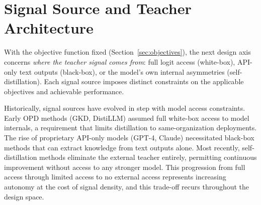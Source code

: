 \documentclass{article} %
\begin{document}
\section{Signal Source and Teacher Architecture}
\label{sec:signal}

With the objective function fixed (Section~\ref{sec:objectives}), the next design axis concerns \emph{where the teacher signal comes from}: full logit access (white-box), API-only text outputs (black-box), or the model's own internal asymmetries (self-distillation). Each signal source imposes distinct constraints on the applicable objectives and achievable performance.

Historically, signal sources have evolved in step with model access constraints. Early OPD methods (GKD, DistiLLM) assumed full white-box access to model internals, a requirement that limits distillation to same-organization deployments. The rise of proprietary API-only models (GPT-4, Claude) necessitated black-box methods that can extract knowledge from text outputs alone. Most recently, self-distillation methods eliminate the external teacher entirely, permitting continuous improvement without access to any stronger model. This progression from full access through limited access to no external access represents increasing autonomy at the cost of signal density, and this trade-off recurs throughout the design space.
\end{document}
